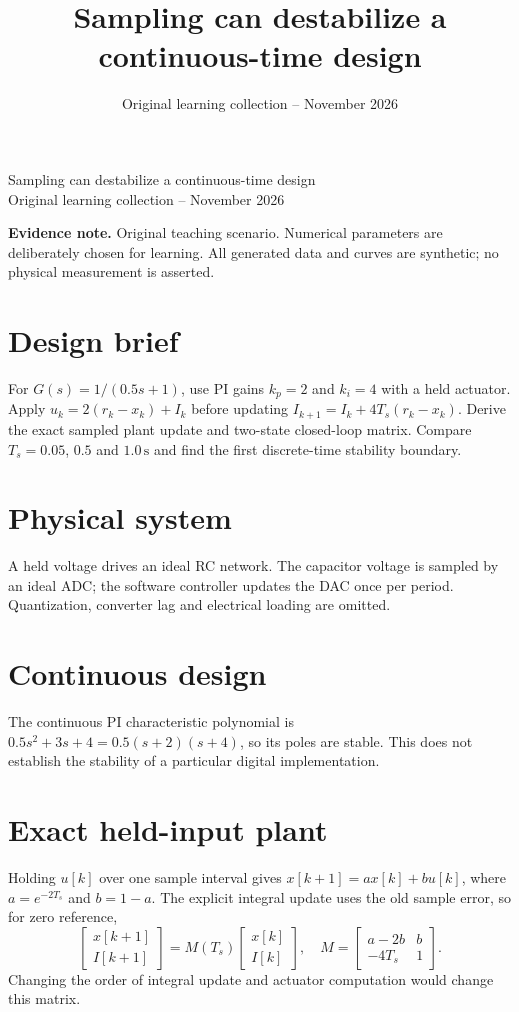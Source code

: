 \documentclass[10pt,a4paper]{article}
\title{\color{ink}Sampling can destabilize a continuous-time design}
\author{}
\date{Original learning collection -- November 2026}
\begin{document}
\begin{center}{\LARGE\color{ink}Sampling can destabilize a continuous-time design}\\[5pt]{\small Original learning collection -- November 2026}\end{center}

\textbf{Evidence note.} Original teaching scenario. Numerical parameters are deliberately chosen for learning. All generated data and curves are synthetic; no physical measurement is asserted.
\section{Design brief}
For $G(s)=1/(0.5s+1)$, use PI gains $k_p=2$ and $k_i=4$ with a held actuator. Apply $u_k=2(r_k-x_k)+I_k$ before updating $I_{k+1}=I_k+4T_s(r_k-x_k)$. Derive the exact sampled plant update and two-state closed-loop matrix. Compare $T_s=0.05$, $0.5$ and $1.0\,\mathrm{s}$ and find the first discrete-time stability boundary.
\section{Physical system}
\begin{center}\resizebox{.88\linewidth}{!}{}\par{\small A held voltage drives an ideal RC network. The capacitor voltage is sampled by an ideal ADC; the software controller updates the DAC once per period. Quantization, converter lag and electrical loading are omitted.}\end{center}
\section{Continuous design}
The continuous PI characteristic polynomial is $0.5s^2+3s+4=0.5(s+2)(s+4)$, so its poles are stable. This does not establish the stability of a particular digital implementation.
\section{Exact held-input plant}
Holding $u[k]$ over one sample interval gives $x[k+1]=ax[k]+bu[k]$, where $a=e^{-2T_s}$ and $b=1-a$. The explicit integral update uses the old sample error, so for zero reference,
\[\begin{bmatrix}x[k+1]\\I[k+1]\end{bmatrix}=M(T_s)\begin{bmatrix}x[k]\\I[k]\end{bmatrix},\quad
M=\begin{bmatrix}a-2b&b\\-4T_s&1\end{bmatrix}.\]
Changing the order of integral update and actuator computation would change this matrix.
\end{document}
